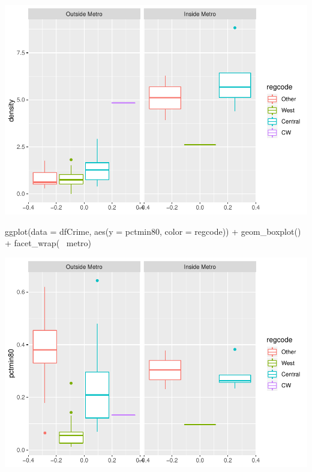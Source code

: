 \documentclass[]{article}
\newenvironment{Shaded}{}{}
\newcommand{\DataTypeTok}[1]{#1}
\newcommand{\KeywordTok}[1]{\textcolor[rgb]{0.00,0.00,1.00}{#1}}
\newcommand{\NormalTok}[1]{#1}
\newcommand{\OperatorTok}[1]{#1}
\newcommand{\StringTok}[1]{\textcolor[rgb]{0.00,0.50,0.50}{#1}}
\begin{document}
\includegraphics{Bagnard_Gaustad_Hartman_Leung_Lab_3_files/figure-latex/unnamed-chunk-27-1.pdf}

\begin{Shaded}
\begin{Highlighting}[]
\KeywordTok{ggplot}\NormalTok{(}\DataTypeTok{data =}\NormalTok{ dfCrime, }\KeywordTok{aes}\NormalTok{(}\DataTypeTok{y =}\NormalTok{ pctmin80, }\DataTypeTok{color =}\NormalTok{ regcode)) }\OperatorTok{+}\StringTok{ }
\StringTok{      }\KeywordTok{geom_boxplot}\NormalTok{() }\OperatorTok{+}\StringTok{ }\KeywordTok{facet_wrap}\NormalTok{(}\OperatorTok{~}\StringTok{ }\NormalTok{metro)}
\end{Highlighting}
\end{Shaded}

\includegraphics{Bagnard_Gaustad_Hartman_Leung_Lab_3_files/figure-latex/unnamed-chunk-27-2.pdf}
\end{document}
